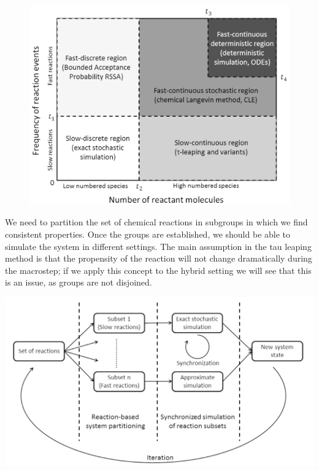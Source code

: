 \begin{figure}
\includegraphics{regions.png}
\end{figure}

We need to partition the set of chemical reactions in subgroups in which we find consistent properties.
Once the groups are established, we should be able to simulate the system in different settings.
The main assumption in the tau leaping method is that the propensity of the reaction will not change dramatically during the macrostep; if we apply this concept to the hybrid setting we will see that this is an issue, as groups are not disjoined.

\includegraphics{scheme.png}


